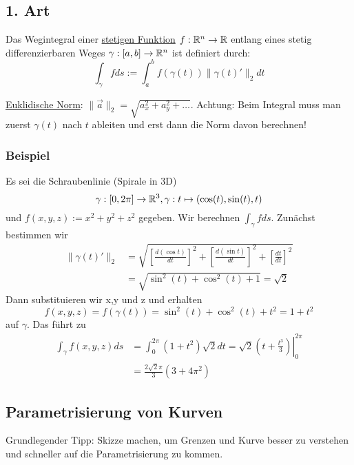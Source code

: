 \subsection{1. Art}
Das Wegintegral einer \underline{stetigen Funktion} $f: \mathbb{R}^n \to \mathbb{R}$ entlang
eines stetig differenzierbaren Weges $\gamma: [a,b] \to \mathbb{R}^n$ ist definiert durch:
\[
\int_\gamma f ds := \int_a^b f(\gamma(t)) \|\gamma(t)'\|_2 dt
\]

\underline{Euklidische Norm}: $\|\vec{a}\|_2 = \sqrt{a_x^2 + a_y^2 + \ldots}$.
Achtung: Beim Integral muss man zuerst $\gamma(t)$ nach $t$ ableiten und erst
dann die Norm davon berechnen!

\subsubsection{Beispiel}
Es sei die Schraubenlinie (Spirale in 3D)
\[
\gamma : [0,2\pi]  \to \mathbb{R}^3, \gamma : t \mapsto  (\cos(t), \sin(t), t) 
\]
und $f(x,y,z) := x^2 + y^2 + z^2$ gegeben. Wir berechnen $\int_\gamma f ds$. Zunächst bestimmen wir
\begin{align*}
\|\gamma(t)'\|_2 &= \sqrt{\left[\frac{d(\cos t)}{dt}\right]^2 +
\left[\frac{d(\sin t)}{dt}\right]^2 + \left[\frac{dt}{dt}\right]^2} \\
&= \sqrt{\sin^2(t)+\cos^2(t)+1}=\sqrt{2}
\end{align*}
Dann substituieren wir x,y und z und erhalten
\[
f(x,y,z) = f(\gamma(t)) = \sin^2(t)+\cos^2(t)+t^2 = 1 +t^2
\]
auf $\gamma$. Das führt zu
\begin{align*}
\int_\gamma f(x,y,z) ds &= \int_0^{2\pi} (1 +t^2)\sqrt{2} dt = \left. \sqrt{2}(t+\frac{t^3}{3}) \right|_0^{2\pi} \\
&= \frac{2\sqrt{2}\pi}{3}(3+4\pi^2)
\end{align*}


\subsection{Parametrisierung von Kurven}
Grundlegender Tipp: Skizze machen, um Grenzen und Kurve besser zu verstehen und
schneller auf die Parametrisierung zu kommen.


